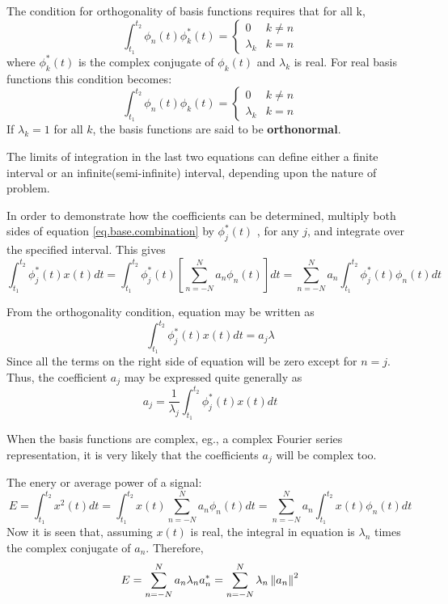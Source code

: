 \documentclass{article}
\begin{document}
The condition for orthogonality of basis functions requires that for all k,
$$
\int_{t_1}^{t_2} \phi_n(t) \phi_k^{*}(t)
=
\begin{cases}
	0 & k \neq n\\
	\lambda_k & k = n
\end{cases}
$$
where $\phi_k^{*}(t)$ is the complex conjugate of $\phi_k(t)$ and $\lambda_k$ is real. For real basis functions this condition becomes:
$$
\int_{t_1}^{t_2} \phi_n(t) \phi_k(t)
=
\begin{cases}
	0 & k \neq n\\
	\lambda_k & k = n
\end{cases}
$$
If $\lambda_k = 1$ for all $k$, the basis functions are said to be \textbf{orthonormal}.

The limits of integration in the last two equations can define either a finite interval or an infinite(semi-infinite) interval, 
depending upon the nature of problem.

In order to demonstrate how the coefficients can be determined, multiply both sides of equation \eqref{eq.base.combination} by $\phi_j^{*}(t)$ , for any $j$, and integrate over the specified interval. This gives
\begin{equation}
\int_{t_1}^{t_2} \phi_j^{*}(t)x(t)dt 
= \int_{t_1}^{t_2} \phi_j^{*}(t) [\sum_{n = -N}^N a_n \phi_n(t)] dt 
= \sum_{n = -N}^N a_n \int_{t_1}^{t_2} \phi_j^{*}(t) \phi_n(t) dt 
\end{equation}

From the orthogonality condition, equation \lasteq may be written as
$$ \int_{t_1}^{t_2} \phi_j^{*}(t) x(t) dt = a_j \lambda $$
Since all the terms on the right side of equation \lasteq will be zero except for $n = j$. Thus, the coefficient $a_j$ may be expressed quite generally as
\begin{equation}
a_j = \frac{1}{\lambda_j} \int_{t_1}^{t_2} \phi_j^*(t) x(t) dt
\end{equation}

When the basis functions are complex, eg., a complex Fourier series representation, it is very likely that the coefficients $a_j$ will be complex too.

The enery or average power of a signal:
\begin{equation}
E 
= \int_{t_1}^{t_2}x^2(t)dt
= \int_{t_1}^{t_2}x(t) \sum_{n = -N}^N a_n \phi_n(t) dt
= \sum_{n = -N}^N a_n \int_{t_1}^{t_2}x(t) \phi_n(t) dt
\end{equation}
Now it is seen that, assuming $x(t)$ is real, the integral in equation \lasteq is $\lambda_n$ times the complex conjugate of $a_n$. Therefore,
\begin{equation}
E
= \sum_{n = -N}^N a_n \lambda_n a_n^* = \sum_{n = -N}^N \lambda_n \left\Vert a_n\right\Vert^2
\end{equation}
\end{document}
